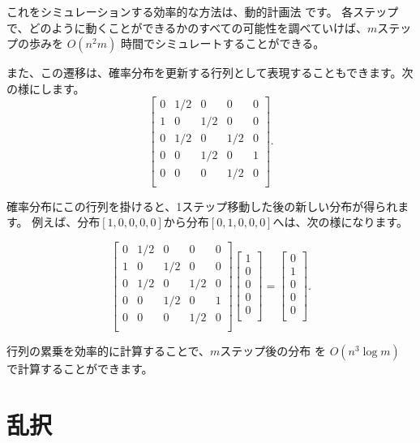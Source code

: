 これをシミュレーションする効率的な方法は、動的計画法 です。
各ステップで、どのように動くことができるかのすべての可能性を調べていけば、$m$ステップの歩みを $O(n^2 m)$ 時間でシミュレートすることができる。

また、この遷移は、確率分布を更新する行列として表現することもできます。次の様にします。
\[
 \begin{bmatrix}
  0 & 1/2 & 0 & 0 & 0 \\
  1 & 0 & 1/2 & 0 & 0 \\
  0 & 1/2 & 0 & 1/2 & 0 \\
  0 & 0 & 1/2 & 0 & 1 \\
  0 & 0 & 0 & 1/2 & 0 \\
 \end{bmatrix}.
\]

確率分布にこの行列を掛けると、1ステップ移動した後の新しい分布が得られます。
例えば、分布$[1,0,0,0,0]$から分布$[0,1,0,0,0]$へは、次の様になります。

\[
 \begin{bmatrix}
  0 & 1/2 & 0 & 0 & 0 \\
  1 & 0 & 1/2 & 0 & 0 \\
  0 & 1/2 & 0 & 1/2 & 0 \\
  0 & 0 & 1/2 & 0 & 1 \\
  0 & 0 & 0 & 1/2 & 0 \\
 \end{bmatrix}
 \begin{bmatrix}
  1 \\
  0 \\
  0 \\
  0 \\
  0 \\
 \end{bmatrix}
=
 \begin{bmatrix}
  0 \\
  1 \\
  0 \\
  0 \\
  0 \\
 \end{bmatrix}.
\]

行列の累乗を効率的に計算することで、$m$ステップ後の分布 を $O(n^3 \log m)$ で計算することができます。

\section{乱択}


